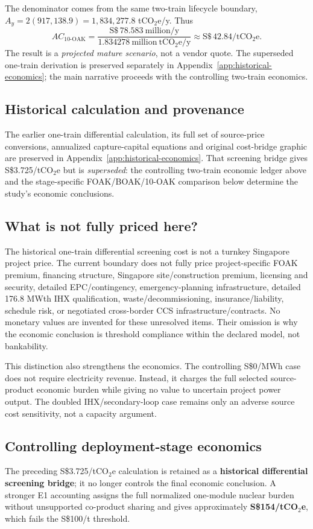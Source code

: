 The denominator comes from the same two-train lifecycle boundary, $A_y=2(917{,}138.9)=1{,}834{,}277.8$ tCO$_2$e/y. Thus
\[
AC_{\mathrm{10\mbox{-}OAK}}
=\frac{\mathrm{S\$}\,78.583\ \mathrm{million/y}}
{1.834278\ \mathrm{million\ tCO_2e/y}}
\approx\mathrm{S\$}\,42.84/\mathrm{tCO_2e}.
\]
The result is a \emph{projected mature scenario}, not a vendor quote. The superseded one-train derivation is preserved separately in Appendix~\ref{app:historical-economics}; the main narrative proceeds with the controlling two-train economics.

\subsection{Historical calculation and provenance}
The earlier one-train differential calculation, its full set of source-price conversions, annualized capture-capital equations and original cost-bridge graphic are preserved in Appendix~\ref{app:historical-economics}. That screening bridge gives S\$3.725/tCO$_2$e but is \emph{superseded}: the controlling two-train economic ledger above and the stage-specific FOAK/BOAK/10-OAK comparison below determine the study's economic conclusions.

\subsection{What is not fully priced here?}
The historical one-train differential screening cost is not a turnkey Singapore project price. The current boundary does not fully price project-specific FOAK premium, financing structure, Singapore site/construction premium, licensing and security, detailed EPC/contingency, emergency-planning infrastructure, detailed 176.8 MWth IHX qualification, waste/decommissioning, insurance/liability, schedule risk, or negotiated cross-border CCS infrastructure/contracts. No monetary values are invented for these unresolved items. Their omission is why the economic conclusion is threshold compliance within the declared model, not bankability.

This distinction also strengthens the economics. The controlling S\$0/MWh case does not require electricity revenue. Instead, it charges the full selected source-product economic burden while giving no value to uncertain project power output. The doubled IHX/secondary-loop case remains only an adverse source cost sensitivity, not a capacity argument.

\subsection{Controlling deployment-stage economics}
\label{sec:stage-economics}
The preceding S\$3.725/tCO$_2$e calculation is retained as a \textbf{historical differential screening bridge}; it no longer controls the final economic conclusion. A stronger E1 accounting assigns the full normalized one-module nuclear burden without unsupported co-product sharing and gives approximately \textbf{S\$154/tCO$_2$e}, which fails the S\$100/t threshold.


